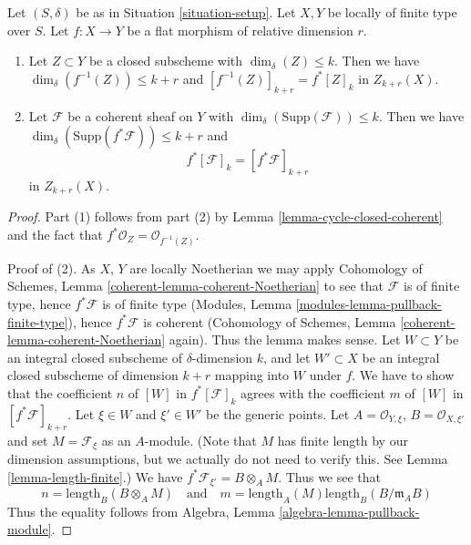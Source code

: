 \begin{lemma}
\label{lemma-pullback-coherent}
Let $(S, \delta)$ be as in Situation \ref{situation-setup}.
Let $X, Y$ be locally of finite type over $S$.
Let $f : X \to Y$ be a flat morphism of relative dimension $r$.
\begin{enumerate}
\item Let $Z \subset Y$ be a closed subscheme with
$\dim_\delta(Z) \leq k$. Then we have
$\dim_\delta(f^{-1}(Z)) \leq k + r$
and $[f^{-1}(Z)]_{k + r} = f^*[Z]_k$ in $Z_{k + r}(X)$.
\item Let $\mathcal{F}$ be a coherent sheaf on $Y$ with
$\dim_\delta(\text{Supp}(\mathcal{F})) \leq k$.
Then we have $\dim_\delta(\text{Supp}(f^*\mathcal{F})) \leq k + r$
and
$$
f^*[{\mathcal F}]_k = [f^*{\mathcal F}]_{k+r}
$$
in $Z_{k + r}(X)$.
\end{enumerate}
\end{lemma}

\begin{proof}
Part (1) follows from part (2) by Lemma \ref{lemma-cycle-closed-coherent}
and the fact that $f^*\mathcal{O}_Z = \mathcal{O}_{f^{-1}(Z)}$.

\medskip\noindent
Proof of (2).
As $X$, $Y$ are locally Noetherian we may apply
Cohomology of Schemes, Lemma \ref{coherent-lemma-coherent-Noetherian} to see
that $\mathcal{F}$ is of finite type, hence $f^*\mathcal{F}$ is
of finite type (Modules, Lemma \ref{modules-lemma-pullback-finite-type}),
hence $f^*\mathcal{F}$ is coherent
(Cohomology of Schemes, Lemma \ref{coherent-lemma-coherent-Noetherian} again).
Thus the lemma makes sense. Let $W \subset Y$ be an integral closed
subscheme of $\delta$-dimension $k$, and let $W' \subset X$ be
an integral closed subscheme of dimension $k + r$ mapping into $W$
under $f$. We have to show that the coefficient $n$ of
$[W]$ in $f^*[{\mathcal F}]_k$ agrees with the coefficient
$m$ of $[W]$ in $[f^*{\mathcal F}]_{k+r}$. Let $\xi \in W$ and
$\xi' \in W'$ be the generic points. Let
$A = \mathcal{O}_{Y, \xi}$, $B = \mathcal{O}_{X, \xi'}$
and set $M = \mathcal{F}_\xi$ as an $A$-module. (Note that
$M$ has finite length by our dimension assumptions, but we
actually do not need to verify this. See
Lemma \ref{lemma-length-finite}.)
We have $f^*\mathcal{F}_{\xi'} = B \otimes_A M$.
Thus we see that
$$
n = \text{length}_B(B \otimes_A M)
\quad
\text{and}
\quad
m = \text{length}_A(M) \text{length}_B(B/\mathfrak m_AB)
$$
Thus the equality follows from
Algebra, Lemma \ref{algebra-lemma-pullback-module}.
\end{proof}



